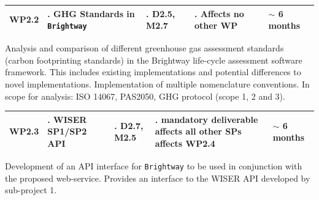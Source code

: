 \documentclass{article}
\begin{document}
    \begin{table}[H]
        \centering
        \begin{tabularx}{\linewidth}{
            |>{\hsize=0.25\hsize}X
            |>{\hsize=1.\hsize}X
            |>{\hsize=1.\hsize}X
            |>{\hsize=1.\hsize}X
            |>{\hsize=0.75\hsize}X|
          } %
            \hline
                WP2.2
            &
                GHG Standards in \texttt{Brightway}
            &
                D2.5, M2.7
            &
                Affects no other WP
            &
                $\sim$ 6 months
            \\
            \hline
        \end{tabularx}
    \end{table}
    
    Analysis and comparison of different greenhouse gas assessment standards (carbon footprinting standards) in the Brightway life-cycle assessment software framework. This includes existing implementations and potential differences to novel implementations. Implementation of multiple nomenclature conventions. In scope for analysis: ISO 14067, PAS2050, GHG protocol (scope 1, 2 and 3).
    
    \begin{table}[H]
        \centering
        \begin{tabularx}{\linewidth}{
            |>{\hsize=0.25\hsize}X
            |>{\hsize=1.\hsize}X
            |>{\hsize=1.\hsize}X
            |>{\hsize=1.\hsize}X
            |>{\hsize=0.75\hsize}X|
          } %
            \hline
                WP2.3
            &
                WISER SP1/SP2 API
            &
                D2.7, M2.5
            &
                mandatory deliverable \newline affects all other SPs \newline affects WP2.4
            &
                $\sim$ 6 months
            \\
            \hline
        \end{tabularx}
    \end{table}
    
    Development of an API interface for \texttt{Brightway} to be used in conjunction with the proposed web-service. Provides an interface to the WISER API developed by sub-project 1.
    
\end{document}
